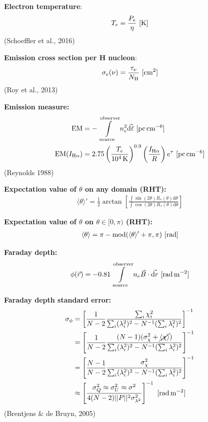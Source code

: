 \documentclass[a4paper,10pt]{article}
\begin{document}
{\noindent}\textbf{Electron temperature}:
\begin{align*}
    T_e = \frac{P_e}{\eta} ~ [{\rm K}]
\end{align*}
(Schoeffler et al., 2016)

{\noindent}\textbf{Emission cross section per H nucleon}:
\begin{align*}
    \sigma_e(\nu) = \frac{\tau_\nu}{N_{\rm H}} ~ [{\rm cm^2}]
\end{align*}
(Roy et al., 2013)

{\noindent}\textbf{Emission measure:}
\begin{align*}
    {\rm EM} &= -\int\limits_\mathrm{source}^\mathrm{observer} n_e^2\vec{{\rm d}\ell} ~ [{\rm pc\,cm^{-6}}] \\
    {\rm EM}(I_{\rm H\alpha}) &= 2.75 \left(\frac{T_e}{10^4\,{\rm K}}\right)^{0.9} \left(\frac{I_{\rm H\alpha}}{R}\right) e^\tau ~ [{\rm pc\,cm^{-6}}]
\end{align*}
(Reynolds 1988)

{\noindent}\textbf{Expectation value of $\theta$ on any domain (RHT):}
\begin{align*}
    \langle\theta\rangle' = \frac{1}{2}\arctan \left[\frac{\int\sin(2\theta)R_*(\theta)\mathrm{d}\theta}{\int\cos(2\theta)R_*(\theta)\mathrm{d}\theta}\right]
\end{align*}

{\noindent}\textbf{Expectation value of $\theta$ on $\theta\in[0,\pi)$ (RHT):}
\begin{align*}
    \langle\theta\rangle = \pi - {\rm mod}(\langle\theta\rangle'+\pi,\pi) ~ [{\rm rad}]
\end{align*}

{\noindent}\textbf{Faraday depth:} 
\begin{align*}
    \phi(\vec{r}) = -0.81 \int\limits_\mathrm{source}^\mathrm{observer}n_e\vec{B}\cdot\vec{{\rm d}r} ~ [{\rm rad\,m^{-2}}]
\end{align*}

{\noindent}\textbf{Faraday depth standard error:}
\begin{align*}
\sigma_\phi &= \left[ \dfrac{1}{N-2} \dfrac{\sum_i\chi_i^2}{\sum_i(\lambda_i^2)^2 - N^{-1}(\sum_i\lambda_i^2)^2} \right]^{-1} \\
&= \left[ \dfrac{1}{N-2} \dfrac{(N-1)(\sigma_\chi^2 + \cancel{\langle\chi\rangle})}{\sum_i(\lambda_i^2)^2 - N^{-1}(\sum_i\lambda_i^2)^2} \right]^{-1} \\
&= \left[ \dfrac{N-1}{N-2} \dfrac{\sigma_\chi^2}{\sum_i(\lambda_i^2)^2 - N^{-1}(\sum_i\lambda_i^2)^2} \right]^{-1} \\
&\approx \left[ \dfrac{\sigma_Q^2\approx\sigma_U^2\approx\sigma^2}{4(N-2)\lvert\lvert P \rvert\rvert^2\sigma_{\lambda^2}^2} \right]^{-1} ~ [{\rm rad\,m^{-2}}]
\end{align*}
(Brentjens \& de Bruyn, 2005)
\end{document}
